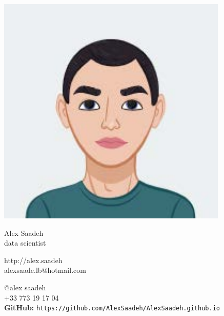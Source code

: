 \documentclass{article}
\begin{document}
\centering \includegraphics[width=.25\linewidth]{logo}\\[5pt]
\parbox{2in}{\Large \centering Alex Saadeh\\[1pt]
\normalsize data scientist}

\vfill
\raggedright
\begin{multicols}{2}
http://alex.saadeh\\
alexsaade.lb@hotmail.com

\columnbreak
\raggedleft
@alex saadeh\\
+33 773 19 17 04\\
\textbf{GitHub:} \texttt{https://github.com/AlexSaadeh/AlexSaadeh.github.io} %
\end{multicols}%
\end{document}
